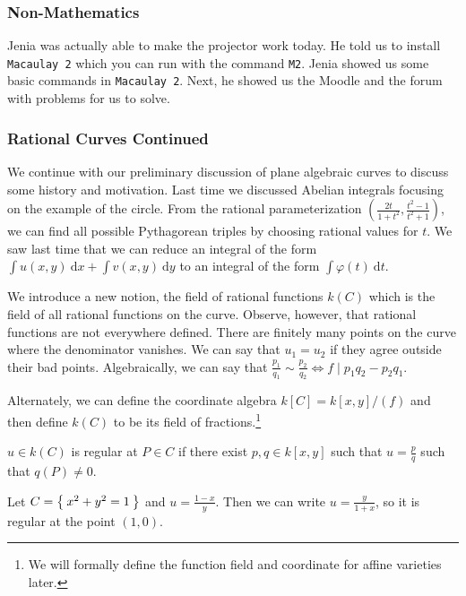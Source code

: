 \documentclass[twoside, 10pt]{article}
\renewcommand{\d}{\ \mathrm{d}}
\begin{document}
    \subsubsection{Non-Mathematics}%
    Jenia was actually able to make the projector work today. He told us to install \texttt{Macaulay 2} which you can run with the command \texttt{M2}. Jenia showed us some basic commands in \texttt{Macaulay 2}. Next, he showed us the Moodle and the forum with problems for us to solve.

    \subsubsection{Rational Curves Continued}%
    We continue with our preliminary discussion of plane algebraic curves to discuss some history and motivation. Last time we discussed Abelian integrals focusing on the example of the circle. From the rational parameterization $\left( \frac{2t}{1+t^2}, \frac{t^2-1}{t^2+1} \right)$, we can find all possible Pythagorean triples by choosing rational values for $t$. We saw last time that we can reduce an integral of the form $\int u(x,y) \d x + \int v(x,y) \d y$ to an integral of the form $\int \varphi(t) \d t$. 

    We introduce a new notion, the field of rational functions $k(C)$ which is the field of all rational functions on the curve. Observe, however, that rational functions are not everywhere defined. There are finitely many points on the curve where the denominator vanishes. We can say that $u_1 = u_2$ if they agree outside their bad points. Algebraically, we can say that $\frac{p_1}{q_1} \sim \frac{p_2}{q_2} \Leftrightarrow f \mid p_1q_2-p_2q_1$. 

    Alternately, we can define the coordinate algebra $k[C] = k[x,y]/(f)$ and then define $k(C)$ to be its field of fractions.\footnote{We will formally define the function field and coordinate for affine varieties later.}

    \begin{defn}
        $u \in k(C)$ is regular at $P \in C$ if there exist $p,q \in k[x,y]$ such that $u=\frac{p}{q}$ such that $q(P) \neq 0$.
    \end{defn}

    \begin{exm}
        Let $C = \Set{x^2+y^2=1}$ and $u = \frac{1-x}{y}$. Then we can write $u = \frac{y}{1+x}$, so it is regular at the point $(1,0)$.
    \end{exm}
\end{document}
